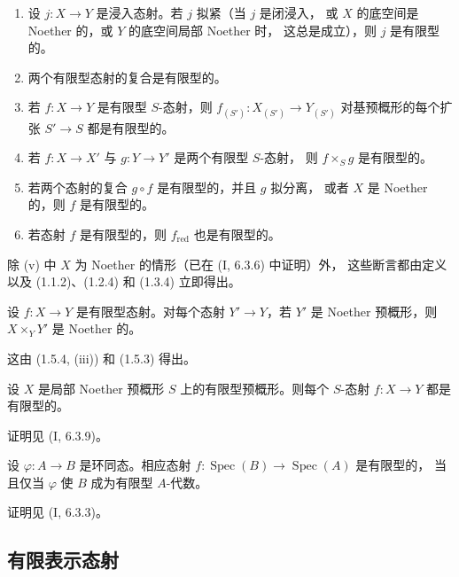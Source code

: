\begin{proposition}[1.5.4]
\label{IV.1.5.4-fr}
\begin{enumerate}
  \item[(i)] 设 $j:X\to Y$ 是浸入态射。若 $j$ 拟紧（当 $j$ 是闭浸入，
  或 $X$ 的底空间是 Noether 的，或 $Y$ 的底空间局部 Noether 时，
  这总是成立），则 $j$ 是有限型的。
  \item[(ii)] 两个有限型态射的复合是有限型的。
  \item[(iii)] 若 $f:X\to Y$ 是有限型 $S$-态射，则
  $f_{(S')}:X_{(S')}\to Y_{(S')}$ 对基预概形的每个扩张 $S'\to S$
  都是有限型的。
  \item[(iv)] 若 $f:X\to X'$ 与 $g:Y\to Y'$ 是两个有限型 $S$-态射，
  则 $f\times_Sg$ 是有限型的。
  \item[(v)] 若两个态射的复合 $g\circ f$ 是有限型的，并且 $g$ 拟分离，
  或者 $X$ 是 Noether 的，则 $f$ 是有限型的。
  \item[(vi)] 若态射 $f$ 是有限型的，则 $f_{\mathrm{red}}$ 也是有限型的。
\end{enumerate}
\end{proposition}

除 (v) 中 $X$ 为 Noether 的情形（已在 (I, 6.3.6) 中证明）外，
这些断言都由定义以及 (1.1.2)、(1.2.4) 和 (1.3.4) 立即得出。

\begin{corollary}[1.5.5]
\label{IV.1.5.5-fr}
设 $f:X\to Y$ 是有限型态射。对每个态射 $Y'\to Y$，若 $Y'$ 是
Noether 预概形，则 $X\times_YY'$ 是 Noether 的。
\end{corollary}

这由 (1.5.4, (iii)) 和 (1.5.3) 得出。

\begin{corollary}[1.5.6]
\label{IV.1.5.6-fr}
设 $X$ 是局部 Noether 预概形 $S$ 上的有限型预概形。则每个 $S$-态射
$f:X\to Y$ 都是有限型的。
\end{corollary}

证明见 (I, 6.3.9)。

\begin{proposition}[1.5.7]
\label{IV.1.5.7-fr}
设 $\varphi:A\to B$ 是环同态。相应态射
$f:\operatorname{Spec}(B)\to\operatorname{Spec}(A)$ 是有限型的，
当且仅当 $\varphi$ 使 $B$ 成为有限型 $A$-代数。
\end{proposition}

证明见 (I, 6.3.3)。

\subsection{有限表示态射}
\label{subsection:IV.1.6-fr}

